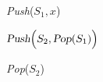 
\begin{algorithm}[H]
  \begin{algorithmic}[]
      \State \textsl{Push}($S_1, x$)
    \EndProcedure

    \Statex
	  \State $\textsl{Push}\Big(S_2, \textsl{Pop}(S_1)\Big)$
	\EndWhile
      \EndIf

      \State \textsl{Pop}($S_2$)
    \EndProcedure
  \end{algorithmic}
\end{algorithm}
